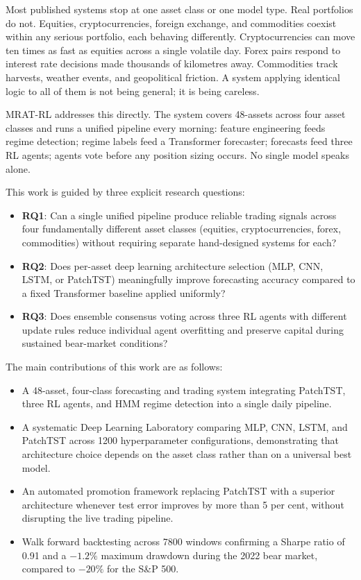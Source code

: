 \documentclass[journal]{IEEEtran}
\begin{document}
Most published systems stop at one asset class or one model type. Real
portfolios do not. Equities, cryptocurrencies, foreign exchange, and
commodities coexist within any serious portfolio, each behaving
differently. Cryptocurrencies can move ten times as fast as equities
across a single volatile day. Forex pairs respond to interest rate
decisions made thousands of kilometres away. Commodities track harvests,
weather events, and geopolitical friction. A system applying identical
logic to all of them is not being general; it is being careless.

MRAT-RL addresses this directly. The system covers 48-assets across four
asset classes and runs a unified pipeline every morning: feature
engineering feeds regime detection; regime labels feed a Transformer
forecaster; forecasts feed three RL agents; agents vote before any
position sizing occurs. No single model speaks alone.

This work is guided by three explicit research questions:
\begin{itemize}
\item \textbf{RQ1}: Can a single unified pipeline produce reliable
      trading signals across four fundamentally different asset classes
      (equities, cryptocurrencies, forex, commodities) without requiring
      separate hand-designed systems for each?
\item \textbf{RQ2}: Does per-asset deep learning architecture selection
      (MLP, CNN, LSTM, or PatchTST) meaningfully improve forecasting
      accuracy compared to a fixed Transformer baseline applied uniformly?
\item \textbf{RQ3}: Does ensemble consensus voting across three RL agents
      with different update rules reduce individual agent overfitting and
      preserve capital during sustained bear-market conditions?
\end{itemize}

The main contributions of this work are as follows:
\begin{itemize}
\item A 48-asset, four-class forecasting and trading system integrating
      PatchTST, three RL agents, and HMM regime detection into a single
      daily pipeline.
\item A systematic Deep Learning Laboratory comparing MLP, CNN, LSTM, and
      PatchTST across 1200 hyperparameter configurations, demonstrating
      that architecture choice depends on the asset class rather than
      on a universal best model.
\item An automated promotion framework replacing PatchTST with a superior
      architecture whenever test error improves by more than 5 per cent,
      without disrupting the live trading pipeline.
\item Walk forward backtesting across 7800 windows confirming a Sharpe
      ratio of 0.91 and a $-1.2\%$ maximum drawdown during the 2022 bear
      market, compared to $-20\%$ for the S\&P 500.
\end{itemize}
\end{document}
